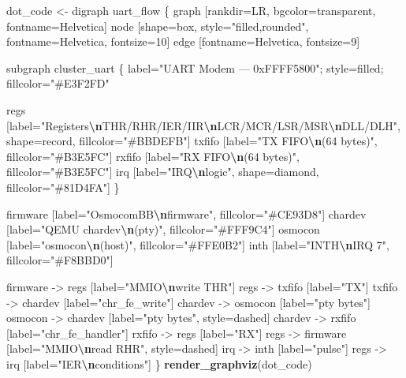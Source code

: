 \documentclass[
]{article}
\newenvironment{Shaded}{\begin{snugshade}}{\end{snugshade}}
\newcommand{\FunctionTok}[1]{\textcolor[rgb]{0.13,0.29,0.53}{\textbf{#1}}}
\newcommand{\NormalTok}[1]{#1}
\newcommand{\OtherTok}[1]{\textcolor[rgb]{0.56,0.35,0.01}{#1}}
\newcommand{\SpecialCharTok}[1]{\textcolor[rgb]{0.81,0.36,0.00}{\textbf{#1}}}
\newcommand{\StringTok}[1]{\textcolor[rgb]{0.31,0.60,0.02}{#1}}
\begin{document}
\begin{Shaded}
\begin{Highlighting}[]
\NormalTok{dot\_code }\OtherTok{\textless{}{-}} \StringTok{\textquotesingle{}digraph uart\_flow \{}
\StringTok{  graph [rankdir=LR, bgcolor=transparent, fontname=Helvetica]}
\StringTok{  node [shape=box, style="filled,rounded", fontname=Helvetica, fontsize=10]}
\StringTok{  edge [fontname=Helvetica, fontsize=9]}

\StringTok{  subgraph cluster\_uart \{}
\StringTok{    label="UART Modem — 0xFFFF5800"; style=filled; fillcolor="\#E3F2FD"}

\StringTok{    regs [label="Registers}\SpecialCharTok{\textbackslash{}n}\StringTok{THR/RHR/IER/IIR}\SpecialCharTok{\textbackslash{}n}\StringTok{LCR/MCR/LSR/MSR}\SpecialCharTok{\textbackslash{}n}\StringTok{DLL/DLH", shape=record,}
\StringTok{          fillcolor="\#BBDEFB"]}
\StringTok{    txfifo [label="TX FIFO}\SpecialCharTok{\textbackslash{}n}\StringTok{(64 bytes)", fillcolor="\#B3E5FC"]}
\StringTok{    rxfifo [label="RX FIFO}\SpecialCharTok{\textbackslash{}n}\StringTok{(64 bytes)", fillcolor="\#B3E5FC"]}
\StringTok{    irq [label="IRQ}\SpecialCharTok{\textbackslash{}n}\StringTok{logic", shape=diamond, fillcolor="\#81D4FA"]}
\StringTok{  \}}

\StringTok{  firmware [label="OsmocomBB}\SpecialCharTok{\textbackslash{}n}\StringTok{firmware", fillcolor="\#CE93D8"]}
\StringTok{  chardev [label="QEMU chardev}\SpecialCharTok{\textbackslash{}n}\StringTok{(pty)", fillcolor="\#FFF9C4"]}
\StringTok{  osmocon [label="osmocon}\SpecialCharTok{\textbackslash{}n}\StringTok{(host)", fillcolor="\#FFE0B2"]}
\StringTok{  inth [label="INTH}\SpecialCharTok{\textbackslash{}n}\StringTok{IRQ 7", fillcolor="\#F8BBD0"]}

\StringTok{  firmware {-}\textgreater{} regs [label="MMIO}\SpecialCharTok{\textbackslash{}n}\StringTok{write THR"]}
\StringTok{  regs {-}\textgreater{} txfifo [label="TX"]}
\StringTok{  txfifo {-}\textgreater{} chardev [label="chr\_fe\_write"]}
\StringTok{  chardev {-}\textgreater{} osmocon [label="pty bytes"]}
\StringTok{  osmocon {-}\textgreater{} chardev [label="pty bytes", style=dashed]}
\StringTok{  chardev {-}\textgreater{} rxfifo [label="chr\_fe\_handler"]}
\StringTok{  rxfifo {-}\textgreater{} regs [label="RX"]}
\StringTok{  regs {-}\textgreater{} firmware [label="MMIO}\SpecialCharTok{\textbackslash{}n}\StringTok{read RHR", style=dashed]}
\StringTok{  irq {-}\textgreater{} inth [label="pulse"]}
\StringTok{  regs {-}\textgreater{} irq [label="IER}\SpecialCharTok{\textbackslash{}n}\StringTok{conditions"]}
\StringTok{\}\textquotesingle{}}
\FunctionTok{render\_graphviz}\NormalTok{(dot\_code)}
\end{Highlighting}
\end{Shaded}
\end{document}

